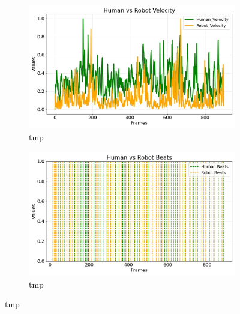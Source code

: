 \documentclass[letterpaper, 10 pt, conference]{ieeeconf}  %
\begin{document}
\begin{figure}[!h]
    \centering
    \begin{subfigure}[b]{\linewidth}
        \centering
        \includegraphics[width=0.9\linewidth]{figures/figure__last_christmas_velocity.jpg}
        \caption{tmp}
    \end{subfigure}
    \vfill
    \begin{subfigure}[b]{\linewidth}
        \centering
        \includegraphics[width=0.9\linewidth]{figures/figure__last_christmas_beats.png}
        \caption{tmp}
    \end{subfigure}
    \caption{tmp}\label{fig:result_last_christmas}
\end{figure}
\end{document}
